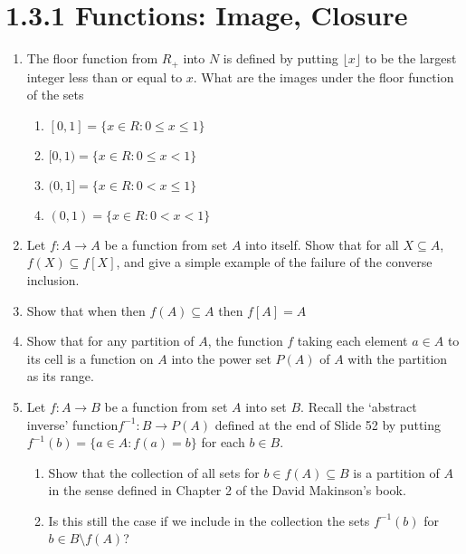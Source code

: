 \documentclass{article}
\begin{document}
\section*{1.3.1 Functions: Image, Closure}
\begin{enumerate}
    \item The floor function from $R_{+}$ into $N$ is defined by putting $\lfloor{x}\rfloor$ to be the largest integer less than or equal to $x$. What are the images under the floor function of the sets
    \begin{enumerate}
        \item $[0, 1] = \{x \in R: 0 \leq x \leq 1 \}$
        \item $[0, 1) = \{x \in R: 0 \leq x < 1 \}$
        \item $(0, 1] = \{x \in R: 0 < x \leq 1 \}$
        \item $(0, 1) = \{x \in R: 0 < x < 1 \}$
    \end{enumerate}
    \item Let $f : A\rightarrow A$ be a function from set $A$ into itself. Show that for all $X \subseteq A$, $f(X) \subseteq f[X]$, and give a simple example of the failure of the converse inclusion.
    \item Show that when then $f(A) \subseteq A$ then $f[A] = A$
    \item Show that for any partition of $A$, the function $f$ taking each element $a \in A$ to its cell is a function on $A$ into the power set $P(A)$ of $A$ with the partition as its range.
    \item Let $f: A \rightarrow B$ be a function from set $A$ into set $B$. Recall the ‘abstract inverse’ function$f^{-1}: B \rightarrow P(A)$ defined at the end of Slide 52 by putting $f^{-1}(b) = \{a \in A: f(a) = b\}$ for each $b \in B$.
    \begin{enumerate}
        \item Show that the collection of all sets for $b \in f(A) \subseteq B$ is a partition of $A$ in the sense defined in Chapter 2 of the David Makinson’s book.
        \item Is this still the case if we include in the collection the sets $f^{-1}(b)$ for $b \in B \setminus f(A)$?
    \end{enumerate}
\end{enumerate}
\end{document}
